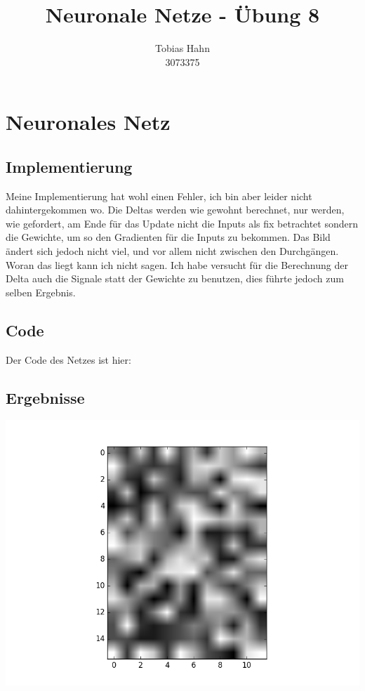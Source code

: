 \documentclass{article}
\title{Neuronale Netze - Übung 8}
\author{Tobias Hahn\\ 3073375}
\begin{document}
\maketitle
\newpage
\section{Neuronales Netz}
\subsection{Implementierung}
Meine Implementierung hat wohl einen Fehler, ich bin aber leider nicht dahintergekommen wo. Die Deltas werden wie gewohnt berechnet, nur werden, wie gefordert, am Ende für das Update nicht die Inputs als fix betrachtet sondern die Gewichte, um so den Gradienten für die Inputs zu bekommen. Das Bild ändert sich jedoch nicht viel, und vor allem nicht zwischen den Durchgängen. Woran das liegt kann ich nicht sagen. Ich habe versucht für die Berechnung der Delta auch die Signale statt der Gewichte zu benutzen, dies führte jedoch zum selben Ergebnis.

\subsection{Code}
Der Code des Netzes ist hier:
\paragraph{}



\subsection{Ergebnisse}
\includegraphics[width=\textwidth]{dream}
\end{document}
